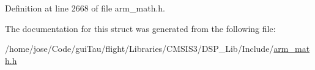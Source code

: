 Definition at line 2668 of file arm\-\_\-math.\-h.



The documentation for this struct was generated from the following file\-:\begin{DoxyCompactItemize}
\item 
/home/jose/\-Code/gui\-Tau/flight/\-Libraries/\-C\-M\-S\-I\-S3/\-D\-S\-P\-\_\-\-Lib/\-Include/\hyperlink{arm__math_8h}{arm\-\_\-math.\-h}\end{DoxyCompactItemize}
